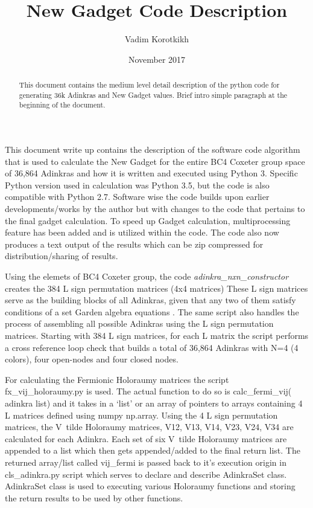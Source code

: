 \documentclass[12pt, letterpaper]{article}
\title{New Gadget Code Description}
\author{Vadim Korotkikh}
\date{November 2017}
\begin{document}
\maketitle

\begin{abstract}
This document contains the medium level detail description of the python code
for generating 36k Adinkras and New Gadget values. Brief intro simple paragraph
at the beginning of the document.
\end{abstract}

This document write up contains the description of the software code algorithm
that is used to calculate the New Gadget for the entire BC4 Coxeter group space
of 36,864 Adinkras and how it is written and executed using Python 3.
Specific Python version used in calculation was Python 3.5, but the code is also
compatible with Python 2.7.
Software wise the code builds upon earlier developments/works by the author but
with changes to the code that pertains to the final gadget calculation.
To speed up Gadget calculation, multiprocessing feature has been added and is
utilized within the code. The code also now produces a text output of the
results which can be zip compressed for distribution/sharing of results. \par


Using the elemets of BC4 Coxeter group, the code \emph{adinkra_nxn_constructor}
creates the 384 L sign permutation matrices (4x4 matrices) These L sign matrices
serve as the building blocks of all Adinkras, given that any two of them satisfy conditions of a set Garden algebra equations . The same
script also handles the process of assembling all possible Adinkras using the L
sign permutation matrices. Starting with 384 L sign matrices, for each L matrix
the script performs a cross reference loop check that builds a total of 36,864
Adinkras with N=4 (4 colors), four open-nodes and four closed nodes.

For calculating the Fermionic Holoraumy matrices the script fx_vij_holoraumy.py
is used. The actual function to do so is calc_fermi_vij( adinkra list) and it
takes in a ‘list’ or an array of pointers to arrays containing 4 L matrices
defined using numpy np.array. Using the 4 L sign permutation matrices, the
V~tilde Holoraumy matrices, V12, V13, V14, V23, V24, V34 are calculated for each
Adinkra. Each set of six V~tilde Holoraumy matrices are appended to a list which
then gets appended/added to the final return list. The returned array/list called
vij_fermi is passed back to it’s execution origin in cls_adinkra.py script which
serves to declare and describe AdinkraSet class. AdinkraSet class is used to
executing various Holoraumy functions and storing the return results to be used
by other functions.
\end{document}
